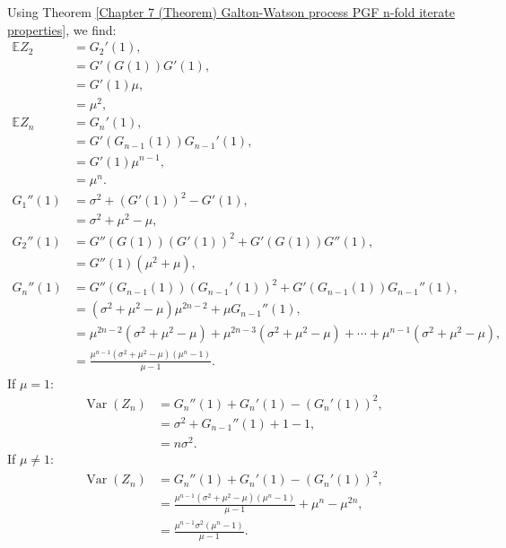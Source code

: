 \documentclass{huhtakm-template-book-v2}
\newcommand{\expect}{\mathbb{E}}
\DeclareMathOperator{\Var}{Var}
\begin{document}
    \begin{proofing}
        Using Theorem \ref{Chapter 7 (Theorem) Galton-Watson process PGF n-fold iterate properties}, we find:
        \begin{align*}
            \expect{Z_{2}} &= G_{2}'(1),\\
            &= G'(G(1))G'(1),\\
            &= G'(1)\mu,\\
            &= \mu^{2},\\
            \expect{Z_{n}} &= G_{n}'(1),\\
            &= G'(G_{n-1}(1))G_{n-1}'(1),\\
            &= G'(1)\mu^{n-1},\\
            &= \mu^{n}.\\
            G_{1}''(1) &= \sigma^{2}+(G'(1))^{2}-G'(1),\\
            &= \sigma^{2}+\mu^{2}-\mu,\\
            G_{2}''(1) &= G''(G(1))(G'(1))^{2}+G'(G(1))G''(1),\\
            &= G''(1)(\mu^{2}+\mu),\\
            G_{n}''(1) &= G''(G_{n-1}(1))(G_{n-1}'(1))^{2}+G'(G_{n-1}(1))G_{n-1}''(1),\\
            &= (\sigma^{2}+\mu^{2}-\mu)\mu^{2n-2}+\mu G_{n-1}''(1),\\
            &= \mu^{2n-2}(\sigma^{2}+\mu^{2}-\mu)+\mu^{2n-3}(\sigma^{2}+\mu^{2}-\mu)+\cdots+\mu^{n-1}(\sigma^{2}+\mu^{2}-\mu),\\
            &= \frac{\mu^{n-1}(\sigma^{2}+\mu^{2}-\mu)(\mu^{n}-1)}{\mu-1}.
        \end{align*}
        If $\mu = 1$:
        \begin{align*}
            \Var(Z_{n}) &= G_{n}''(1)+G_{n}'(1)-(G_{n}'(1))^{2},\\
            &= \sigma^{2}+G_{n-1}''(1)+1-1,\\
            &= n\sigma^{2}.
        \end{align*}
        If $\mu \neq 1$:
        \begin{align*}
            \Var(Z_{n}) &= G_{n}''(1)+G_{n}'(1)-(G_{n}'(1))^{2},\\
            &= \frac{\mu^{n-1}(\sigma^{2}+\mu^{2}-\mu)(\mu^{n}-1)}{\mu-1}+\mu^{n}-\mu^{2n},\\
            &= \frac{\mu^{n-1}\sigma^{2}(\mu^{n}-1)}{\mu-1}.
        \end{align*}
    \end{proofing}
\end{document}
